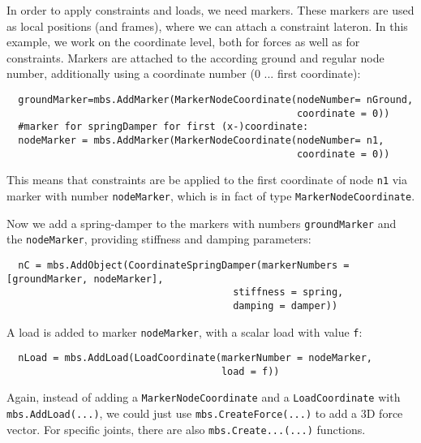 In order to apply constraints and loads, we need markers. These markers are used as local positions (and frames), where we can attach a constraint lateron. In this example, we work on the coordinate level, both for forces as well as for constraints.
Markers are attached to the according ground and regular node number, additionally using a coordinate number (0 ... first coordinate):
\pythonstyle\begin{lstlisting}
  groundMarker=mbs.AddMarker(MarkerNodeCoordinate(nodeNumber= nGround, 
                                                  coordinate = 0))
  #marker for springDamper for first (x-)coordinate:
  nodeMarker = mbs.AddMarker(MarkerNodeCoordinate(nodeNumber= n1, 
                                                  coordinate = 0))
\end{lstlisting}
This means that constraints are be applied to the first coordinate of node \texttt{n1} via marker with number \texttt{nodeMarker}, which is in fact of type \texttt{MarkerNodeCoordinate}.

Now we add a spring-damper to the markers with numbers \texttt{groundMarker} and the \texttt{nodeMarker}, providing stiffness and damping parameters:
\pythonstyle\begin{lstlisting}
  nC = mbs.AddObject(CoordinateSpringDamper(markerNumbers = [groundMarker, nodeMarker], 
                                       stiffness = spring, 
                                       damping = damper)) 
\end{lstlisting}
%
A load is added to marker \texttt{nodeMarker}, with a scalar load with value \texttt{f}:
\pythonstyle\begin{lstlisting}
  nLoad = mbs.AddLoad(LoadCoordinate(markerNumber = nodeMarker, 
                                     load = f))
\end{lstlisting}
Again, instead of adding a \texttt{MarkerNodeCoordinate} and a \texttt{LoadCoordinate} with \texttt{mbs.AddLoad(...)},
we could just use \texttt{mbs.CreateForce(...)} to add a 3D force vector.
For specific joints, there are also \texttt{mbs.Create...(...)} functions.

